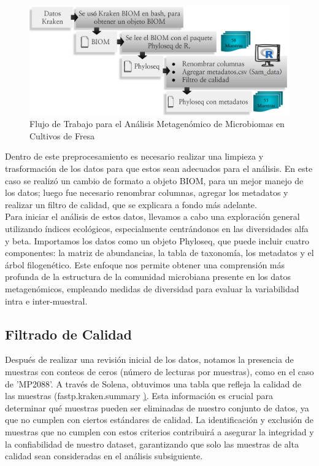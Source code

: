 \begin{figure}[h]
\centering
\includegraphics[width=\textwidth]{Img/cap2/preprosecamiento.png}
\caption{Flujo de Trabajo para el Análisis Metagenómico de Microbiomas en Cultivos de Fresa}
\end{figure}

Dentro de este preprocesamiento es necesario realizar una limpieza y trasformación de los datos para que estos sean adecuados para el análisis. En este caso se realizó un cambio de formato a objeto BIOM, para un mejor manejo de los datos; luego fue necesario renombrar columnas, agregar los metadatos y realizar un filtro de calidad, que se explicara a fondo más adelante.\\

Para iniciar el análisis de estos datos, llevamos a cabo una exploración general utilizando índices ecológicos, especialmente centrándonos en las diversidades alfa y beta. Importamos los datos como un objeto Phyloseq, que puede incluir cuatro componentes: la matriz de abundancias, la tabla de taxonomía, los metadatos y el árbol filogenético. Este enfoque nos permite obtener una comprensión más profunda de la estructura de la comunidad microbiana presente en los datos metagenómicos, empleando medidas de diversidad para evaluar la variabilidad intra e inter-muestral.\\

\subsection{Filtrado de Calidad}

Después de realizar una revisión inicial de los datos, notamos la presencia de muestras con conteos de ceros (número de lecturas por muestras), como en el caso de 'MP2088'. A través de Solena, obtuvimos una tabla que refleja la calidad de las muestras (fastp.kraken.summary \href{https://github.com/CamilaSilva1995/Tesis_Maestria/blob/main/Analisis_Comparativo/Fresa_Solena/01_Exploracion.pdf}). Esta información es crucial para determinar qué muestras pueden ser eliminadas de nuestro conjunto de datos, ya que no cumplen con ciertos estándares de calidad. La identificación y exclusión de muestras que no cumplen con estos criterios contribuirá a asegurar la integridad y la confiabilidad de nuestro dataset, garantizando que solo las muestras de alta calidad sean consideradas en el análisis subsiguiente.\\

